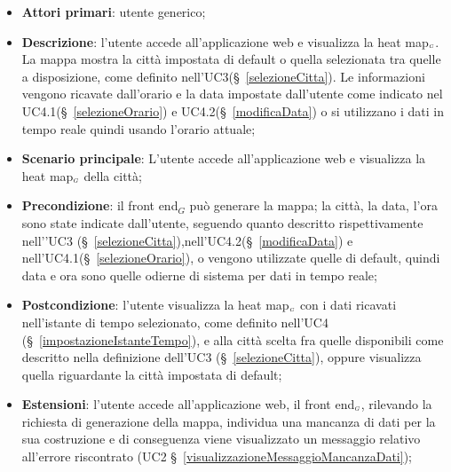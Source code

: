 \begin{itemize}
	\item \textbf{Attori primari}: utente generico;
	\item \textbf{Descrizione}: l’utente accede all’applicazione web e visualizza la heat map$_{\scaleto{G}{3pt}}$. La mappa mostra la città impostata di default o quella selezionata tra quelle a disposizione, come definito nell’UC3(\S~\ref{selezioneCitta}). Le informazioni vengono ricavate dall’orario e la data impostate dall’utente come indicato nel UC4.1(\S~\ref{selezioneOrario}) e UC4.2(\S~\ref{modificaData}) o si utilizzano i dati in tempo reale quindi usando l’orario attuale;
	\item \textbf{Scenario principale}: L’utente accede all’applicazione web e visualizza la heat map$_{\scaleto{G}{3pt}}$ della città;
	\item \textbf{Precondizione}: il front end$_G$ può generare la mappa; la città, la data, l’ora sono state indicate dall’utente, seguendo quanto descritto rispettivamente nell'’UC3 (\S~\ref{selezioneCitta}),nell'UC4.2(\S~\ref{modificaData}) e nell'UC4.1(\S~\ref{selezioneOrario}), o vengono utilizzate quelle di default, quindi data e ora sono quelle odierne di sistema per dati in tempo reale;
	\item \textbf{Postcondizione}: l’utente visualizza la heat map$_{\scaleto{G}{3pt}}$ con i dati ricavati nell’istante di tempo selezionato, come definito nell’UC4 (\S~\ref{impostazioneIstanteTempo}), e alla città scelta fra quelle disponibili come descritto nella definizione dell’UC3 (\S~\ref{selezioneCitta}), oppure visualizza quella riguardante la città impostata di default;
	\item \textbf{Estensioni}: l’utente accede all’applicazione web, il front end$_{\scaleto{G}{3pt}}$, rilevando la richiesta di generazione della mappa, individua una mancanza di dati per la sua costruzione e di conseguenza viene visualizzato un messaggio relativo all’errore riscontrato (UC2 \S~\ref{visualizzazioneMessaggioMancanzaDati});
\end{itemize}

